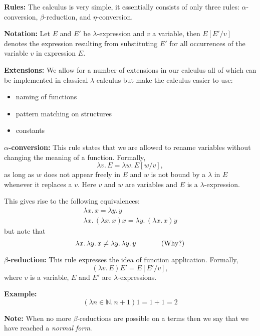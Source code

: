 \documentclass[a4paper,blends,pdf,colorBG,slideColor]{prosper}
\begin{document}
\es


{\bf Rules:} The calculus is very simple, it essentially consists of only three rules:
$\alpha$-conversion, $\beta$-reduction, and $\eta$-conversion.

{\bf Notation:}  Let $E$ and $E'$ be $\lambda$-expression and $v$ a variable, then $E[E'/v]$
denotes the expression resulting from substituting $E'$ for all occurrences  of the variable $v$ in expression $E$.

{\bf Extensions:} We allow for a number of extensions in our calculus all of which can be implemented in
classical $\lambda$-calculus but make the calculus easier to use:
\begin{itemize}
\item naming of functions 
\item pattern matching on structures
\item constants
\end{itemize}
\es



{\small

{\bf $\alpha$-conversion:} This rule states that we are allowed  to rename variables without changing
the meaning of a function.  Formally,
\[
\lambda v.\,E = \lambda w.\,E[w/v],
\]
as long as $w$ does not appear freely in $E$ and $w$ is not bound by a $\lambda$ in $E$ whenever it replaces a $v$.
Here $v$ and $w$ are variables and $E$ is a $\lambda$-expression.

This gives rise to the following equivalences:
\[
\begin{array}{l}
\lambda x.\, x = \lambda y.\, y\\
\lambda x.\,(\lambda x.\, x)x = \lambda y.\,(\lambda x.\, x)y
\end{array}
\]
but note that
\[
\lambda x.\,\lambda y.\,x \ne \lambda y.\,\lambda y.\,y    \hspace{.5in}\mbox{(Why?)}
\]
}
\es



{\bf $\beta$-reduction:} This rule expresses the idea of function application. Formally,
\[
(\lambda v. \, E)E' = E[E'/v],
\]
where $v$ is a variable, $E$ and $E'$ are $\lambda$-expressions.

{\bf Example:}
\[
(\lambda n \in {\mathbb{N}}.\, n + 1)1 = 1 + 1 = 2
\]


{\bf Note:} When no more $\beta$-reductions are possible on a terms then we say that we have reached
a {\em normal form}.
\es
\end{document}
